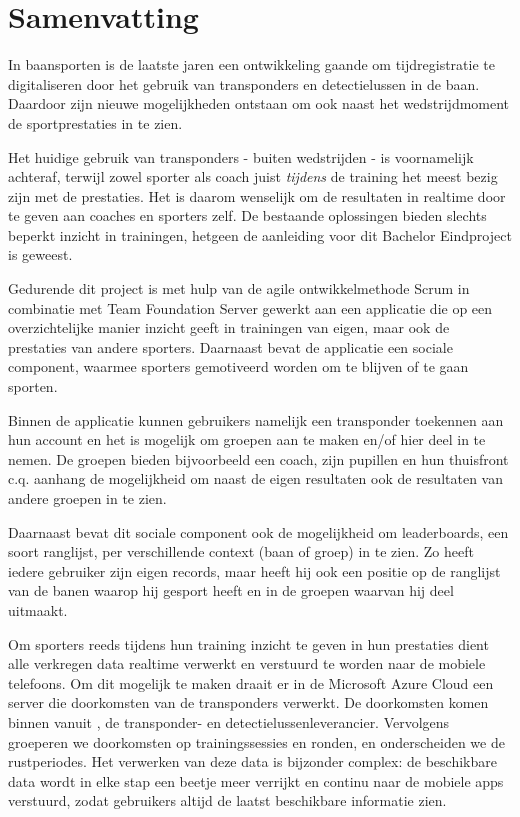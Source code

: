 \chapter*{Samenvatting}

In baansporten is de laatste jaren een ontwikkeling gaande om tijdregistratie te digitaliseren door het gebruik van transponders en detectielussen in de baan. Daardoor zijn nieuwe mogelijkheden ontstaan om ook naast het wedstrijdmoment de sportprestaties in te zien.

Het huidige gebruik van transponders - buiten wedstrijden - is voornamelijk achteraf, terwijl zowel sporter als coach juist \textit{tijdens} de training het meest bezig zijn met de prestaties. Het is daarom wenselijk om de resultaten in realtime door te geven aan coaches en sporters zelf. De bestaande oplossingen bieden slechts beperkt inzicht in trainingen, hetgeen de aanleiding voor dit Bachelor Eindproject is geweest.

\medskip

\noindent 
Gedurende dit project is met hulp van de agile ontwikkelmethode Scrum in combinatie met Team Foundation Server gewerkt aan een applicatie die op een overzichtelijke manier inzicht geeft in trainingen van eigen, maar ook de prestaties van andere sporters. Daarnaast bevat de applicatie een sociale component, waarmee sporters gemotiveerd worden om te blijven of te gaan sporten.

Binnen de applicatie kunnen gebruikers namelijk een transponder toekennen aan hun account en het is mogelijk om groepen aan te maken en/of hier deel in te nemen. De groepen bieden bijvoorbeeld een coach, zijn pupillen en hun thuisfront c.q. aanhang de mogelijkheid om naast de eigen resultaten ook de resultaten van andere groepen in te zien.

Daarnaast bevat dit sociale component ook de mogelijkheid om leaderboards, een soort ranglijst, per verschillende context (baan of groep) in te zien. Zo heeft iedere gebruiker zijn eigen records, maar heeft hij ook een positie op de ranglijst van de banen waarop hij gesport heeft en in de groepen waarvan hij deel uitmaakt.

\medskip

\noindent
Om sporters reeds tijdens hun training inzicht te geven in hun prestaties dient alle verkregen data realtime verwerkt en verstuurd te worden naar de mobiele telefoons. Om dit mogelijk te maken draait er in de Microsoft Azure Cloud een server die doorkomsten van de transponders verwerkt. De doorkomsten komen binnen vanuit \mylaps, de transponder- en detectielussenleverancier. Vervolgens groeperen we doorkomsten op trainingssessies en ronden, en onderscheiden we de rustperiodes. Het verwerken van deze data is bijzonder complex: de beschikbare data wordt in elke stap een beetje meer verrijkt en continu naar de mobiele apps verstuurd, zodat gebruikers altijd de laatst beschikbare informatie zien.

